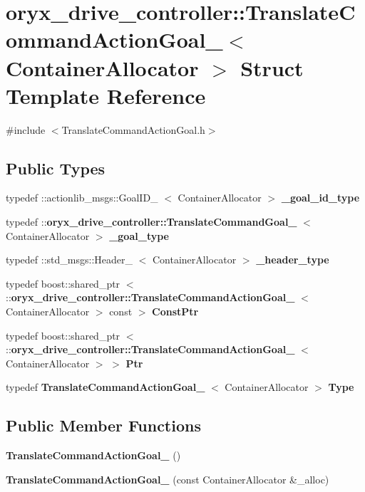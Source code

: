 \section{oryx\-\_\-drive\-\_\-controller\-:\-:\-Translate\-Command\-Action\-Goal\-\_\-$<$ \-Container\-Allocator $>$ \-Struct \-Template \-Reference}
\label{structoryx__drive__controller_1_1TranslateCommandActionGoal__}


{\ttfamily \#include $<$\-Translate\-Command\-Action\-Goal.\-h$>$}

\subsection*{\-Public \-Types}
\begin{DoxyCompactItemize}
\item 
typedef \*
\-::actionlib\-\_\-msgs\-::\-Goal\-I\-D\-\_\-\*
$<$ \-Container\-Allocator $>$ {\bf \-\_\-goal\-\_\-id\-\_\-type}
\item 
typedef \*
\-::{\bf oryx\-\_\-drive\-\_\-controller\-::\-Translate\-Command\-Goal\-\_\-}\*
$<$ \-Container\-Allocator $>$ {\bf \-\_\-goal\-\_\-type}
\item 
typedef \-::std\-\_\-msgs\-::\-Header\-\_\-\*
$<$ \-Container\-Allocator $>$ {\bf \-\_\-header\-\_\-type}
\item 
typedef boost\-::shared\-\_\-ptr\*
$<$ \-::{\bf oryx\-\_\-drive\-\_\-controller\-::\-Translate\-Command\-Action\-Goal\-\_\-}\*
$<$ \-Container\-Allocator $>$ const  $>$ {\bf \-Const\-Ptr}
\item 
typedef boost\-::shared\-\_\-ptr\*
$<$ \-::{\bf oryx\-\_\-drive\-\_\-controller\-::\-Translate\-Command\-Action\-Goal\-\_\-}\*
$<$ \-Container\-Allocator $>$ $>$ {\bf \-Ptr}
\item 
typedef \*
{\bf \-Translate\-Command\-Action\-Goal\-\_\-}\*
$<$ \-Container\-Allocator $>$ {\bf \-Type}
\end{DoxyCompactItemize}
\subsection*{\-Public \-Member \-Functions}
\begin{DoxyCompactItemize}
\item 
{\bf \-Translate\-Command\-Action\-Goal\-\_\-} ()
\item 
{\bf \-Translate\-Command\-Action\-Goal\-\_\-} (const \-Container\-Allocator \&\-\_\-alloc)
\end{DoxyCompactItemize}
